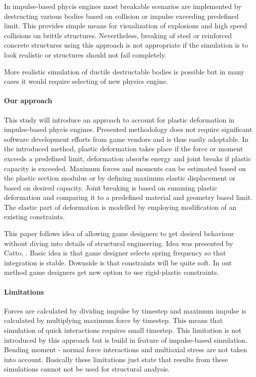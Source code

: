 \documentclass{jcgt}
\begin{document}
In impulse-based phycis engines most breakable scenarios  are implemented by destructing various bodies based on collision
or impulse exceeding predefined limit. This provides simple means for visualization of explosions and high speed collisions 
on brittle structures.  
Nevertheless, breaking of steel or reinforced concrete structures using this approach 
is not appropriate if the simulation is to look realistic or structures should not fail completely.

More realistic simulation of ductile destructable bodies is possible but in many cases it would require 
selecting of new physics engine.

\paragraph{Our approach}
This study will introduce an approach to account for plastic deformation in impulse-based phycis engines.   
Presented methodology does not require significant software development efforts from
game vendors and is thus easily adoptable. 
In the introduced method, plastic deformation takes place if the force or moment exceeds a predefined 
limit, deformation absorbs energy and joint breaks if plastic capacity is exceeded. 
Maximum forces and moments can be estimated based on the plastic section modulus or
by defining maximum elastic displacement or based on desired capacity.
Joint breaking is based on summing plastic deformation and comparing it to a
predefined material and geometry based limit. The elastic part of deformation is modelled by employing 
modification of an existing constraints. 

This paper follows idea of
allowing game designers to get desired behaviour without diving into details of structural engineering.
Idea was presented by Catto, \cite{ecsc}. Basic idea is that game designer selects spring frequency so that
integration is stable. Downside is that constraints will be quite soft. In out method game designers get new option
to use rigid-plastic constraints.

\paragraph{Limitations}
Forces are calculated by dividing impulse by timestep and maximum impulse is calculated
by multiplying maximum force by timestep. 
This means that simulation of quick interactions requires small timestep.
This limitation is not introduced by this approach but is build in feature of impulse-based simulation.
Bending moment - normal force interactions and multiaxial stress are not taken into account. 
Basically these limitations just state that results from these simulations cannot not be used
for structural analysis. 
\end{document}
